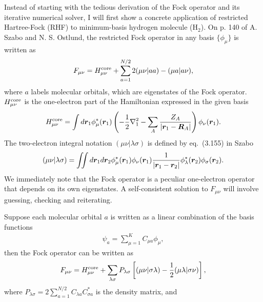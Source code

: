 Instead of starting with the tedious derivation of the Fock operator and its iterative numerical solver, I will first show a concrete application of restricted Hartree-Fock (RHF) to minimum-basis hydrogen molecule (H$_2$). %
On p. 140 of A. Szabo and N. S. Ostlund, the restricted Fock operator in any basis $\{\phi_\mu\}$ is written as
\begin{align}
F_{\mu\nu} = H^{\text{core}}_{\mu\nu} + \sum\limits_{a=1}^{N/2} 2(\mu\nu|aa) - (\mu a|a\nu),
\end{align} %
where $a$ labels molecular orbitals, which are eigenstates of the Fock operator. $H^{\text{core}}_{\mu\nu}$ is the one-electron part of the Hamiltonian expressed in the given basis %
\begin{align} \label{eq:hf-hcore}
H^{\text{core}}_{\mu\nu} = \int d\boldsymbol{r}_1 \phi_\mu^*(\boldsymbol{r}_1)\left(
-\frac{1}{2}\nabla_1^2-\sum\limits_A \dfrac{Z_A}{\vert\boldsymbol{r}_1-\boldsymbol{R}_A\vert}
\right)  \phi_\nu(\boldsymbol{r}_1).
\end{align}
The two-electron integral notation $(\mu\nu|\lambda\sigma)$ is defined by eq.~(3.155) in Szabo
\begin{align} \label{eq:hf-eri}
(\mu\nu|\lambda\sigma) = \iint d\boldsymbol{r}_1 d\boldsymbol{r}_2 \phi_\mu^*(\boldsymbol{r}_1)\phi_{\nu}(\boldsymbol{r}_1)
\frac{1}{\vert\boldsymbol{r}_1-\boldsymbol{r}_2\vert}
\phi_\lambda^*(\boldsymbol{r}_2)\phi_\sigma(\boldsymbol{r}_2).
\end{align}
We immediately note that the Fock operator is a peculiar one-electron operator that depends on its own eigenstates. A self-consistent solution to $F_{\mu\nu}$ will involve guessing, checking and reiterating.

Suppose each molecular orbital $a$ is written as a linear combination of the basis functions
\begin{align}
\psi_a = \sum\limits_{\mu=1}^K C_{\mu a} \phi_\mu,
\end{align}
then the Fock operator can be written as
\begin{align}
F_{\mu\nu} = H^{\text{core}}_{\mu\nu} + \sum\limits_{\lambda\sigma} P_{\lambda\sigma} \left[
(\mu\nu|\sigma\lambda) - \frac{1}{2}(\mu\lambda|\sigma\nu)
\right],
\end{align} %
where $P_{\lambda\sigma}=2\sum_{a=1}^{N/2} C_{\lambda a}C_{\sigma a}^*$ is the density matrix, %
and 

